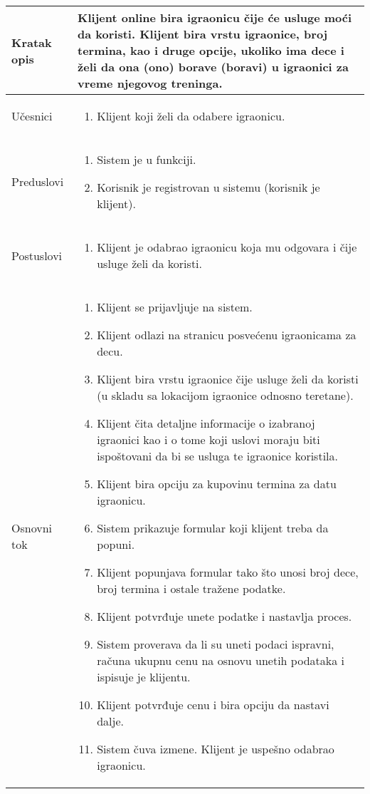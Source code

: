 \documentclass[../../main.tex]{subfiles}
\begin{document}
\begin{longtable}{| p{} | p{} |} 
\hline
    Kratak opis & Klijent online bira igraonicu čije će usluge moći da koristi. Klijent bira vrstu igraonice, broj termina, kao i druge opcije, ukoliko ima dece i želi da ona (ono) borave (boravi) u igraonici za vreme njegovog treninga. \\ 
\hline    
    Učesnici &
    \begin{enumerate}
        \item Klijent koji želi da odabere igraonicu.
    \end{enumerate}\\
\hline
   Preduslovi &
   \begin{enumerate}
        \item Sistem je u funkciji.
        \item Korisnik je registrovan u sistemu (korisnik je klijent).
    \end{enumerate}\\
\hline  
    Postuslovi & 
    \begin{enumerate}
        \item Klijent je odabrao igraonicu koja mu odgovara i čije usluge želi da koristi.
    \end{enumerate} \\
\hline
    Osnovni tok & 
    \begin{enumerate}
        \item Klijent se prijavljuje na sistem.
        \item Klijent odlazi na stranicu posvećenu igraonicama za decu.
        \item Klijent bira vrstu igraonice čije usluge želi da koristi (u skladu sa lokacijom igraonice odnosno teretane).
        \item Klijent čita detaljne informacije o izabranoj igraonici kao i o tome koji uslovi moraju biti ispoštovani da bi se usluga te igraonice koristila.
        \item Klijent bira opciju za kupovinu termina za datu igraonicu.
        \item Sistem prikazuje formular koji klijent treba da popuni.
        \item Klijent popunjava formular tako što unosi broj dece, broj termina i ostale tražene podatke.
        \item Klijent potvrđuje unete podatke i nastavlja proces.
        \item Sistem proverava da li su uneti podaci ispravni, računa ukupnu cenu na osnovu unetih podataka i ispisuje je klijentu.
        \item Klijent potvrđuje cenu i bira opciju da nastavi dalje. 
        \item Sistem čuva izmene. Klijent je uspešno odabrao igraonicu. %
        

\end{enumerate}
\end{longtable}
\end{document}
